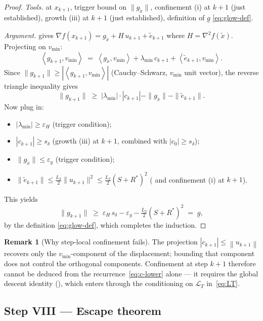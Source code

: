 \documentclass[11pt,a4paper]{article}
\theoremstyle{plain}
\theoremstyle{definition}
\newtheorem{remark}{Remark}
\newcommand{\norm}[1]{\left\|#1\right\|}
\newcommand{\inner}[2]{\left\langle #1,#2 \right\rangle}
\newcommand{\eps}{\varepsilon}
\newcommand{\epsg}{\eps_{g}}
\newcommand{\epsH}{\eps_{H}}
\newcommand{\grad}{\nabla}
\newcommand{\hess}{\nabla^{2}}
\newcommand{\Ltwo}{L_{2}}
\newcommand{\snap}{\tilde{x}}
\newcommand{\vmin}{v_{\min}}
\newcommand{\sdel}{s_{\delta}}
\newcommand{\glow}{\underline{g}}
\newcommand{\Rstar}{R^{*}}
\begin{document}
\begin{proof}
\emph{Tools.}  at $x_{k+1}$, trigger bound on
$\|g_{\snap}\|$, confinement (i) at $k+1$ (just established), growth (iii) at $k+1$
(just established), definition of $\glow$ \eqref{eq:glow-def}.

\emph{Argument.}  gives
$\grad f(x_{k+1}) = g_{\snap} + H\,u_{k+1} + \tilde e_{k+1}$ where
$H = \hess f(\snap)$. Projecting on $\vmin$:
\[
\inner{g_{k+1}}{\vmin}
\;=\; \inner{g_{\snap}}{\vmin}
   + \lambda_{\min}\,c_{k+1}
   + \inner{\tilde e_{k+1}}{\vmin}.
\]
Since $\|g_{k+1}\| \ge |\inner{g_{k+1}}{\vmin}|$ (Cauchy--Schwarz, $\vmin$
unit vector), the reverse triangle inequality gives
\[
\|g_{k+1}\|
\;\ge\; |\lambda_{\min}|\cdot|c_{k+1}|
       - \|g_{\snap}\|
       - \|\tilde e_{k+1}\|.
\]
Now plug in:
\begin{itemize}
\item $|\lambda_{\min}| \ge \epsH$ (trigger condition);
\item $|c_{k+1}| \ge \sdel$ (growth (iii) at $k+1$, combined with $|c_0| \ge \sdel$);
\item $\|g_{\snap}\| \le \epsg$ (trigger condition);
\item $\|\tilde e_{k+1}\| \le \tfrac{\Ltwo}{2}\|u_{k+1}\|^2 \le \tfrac{\Ltwo}{2}(S+\Rstar)^2$ ( and confinement (i) at $k+1$).
\end{itemize}
This yields
\[
\|g_{k+1}\|
\;\ge\; \epsH\,\sdel - \epsg - \tfrac{\Ltwo}{2}(S+\Rstar)^2
\;=\; \glow,
\]
by the definition \eqref{eq:glow-def}, which completes the induction.
\end{proof}

\begin{remark}[Why step-local confinement fails]\label{rem:confinement-needs-imploc}
The projection $|c_{k+1}|\le\norm{u_{k+1}}$ recovers only the $\vmin$-component
of the displacement; bounding that component does not control the orthogonal
components. Confinement at step $k+1$ therefore cannot be deduced from the
recurrence~\eqref{eq:c-lower} alone --- it requires the global descent identity
(), which enters through the conditioning on $\mathcal{L}_T$
in~\eqref{eq:LT}.
\end{remark}


\subsection{Step VIII --- Escape theorem}\label{sub:escape}
\end{document}
